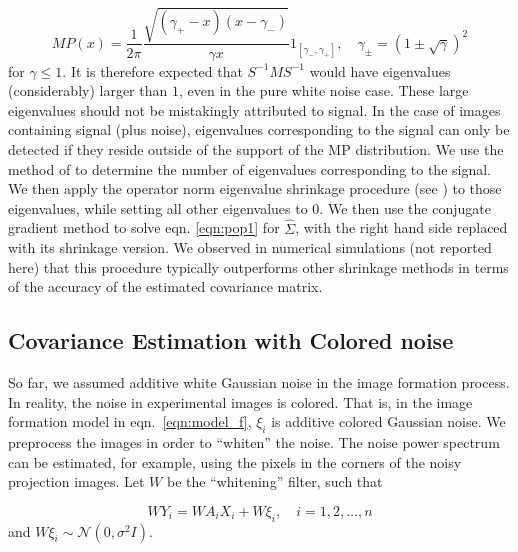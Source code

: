 \documentclass[review]{elsarticle}
\begin{document}
\begin{equation}
MP(x) = \frac{1}{2\pi}\frac{\sqrt{(\gamma_+ - x)(x - \gamma_-)}}{\gamma x}1_{[\gamma_-,\gamma_+]}, \quad \gamma_{\pm} =(1 \pm \sqrt{\gamma})^2 
\end{equation}
for $\gamma \leq 1$. It is therefore expected that $S^{-1}MS^{-1}$ would have eigenvalues 
(considerably) larger than $1$, even in the pure white noise case. These large 
eigenvalues should not be mistakingly attributed to signal. In the case of 
images containing signal (plus noise), eigenvalues corresponding to the signal 
can only be detected if they reside outside of the support of the MP 
distribution. We use the method of \cite{knadler} to determine the number of eigenvalues 
corresponding to the signal. We then apply the operator norm eigenvalue 
shrinkage procedure (see \cite{donoho}) to those eigenvalues, while setting all other eigenvalues to 
$0$. We then use the conjugate gradient method to solve eqn. \ref{eqn:pop1} for $\hat{\Sigma}$, with the right hand side 
replaced with its shrinkage version. We observed in numerical simulations (not reported here) that this procedure
typically outperforms other shrinkage methods in terms of the accuracy of the estimated covariance matrix.
 

\subsection{Covariance Estimation with Colored noise}
\label{sec:covest_col}
So far, we assumed additive white Gaussian noise in the image formation 
process. In reality, the noise in experimental images
is colored. That is, in the image formation model in eqn.\ \ref{eqn:model_f},
$\xi_i$ is additive colored Gaussian noise. 
We preprocess the images in order to ``whiten'' the noise.
The noise power spectrum can be estimated, for example, using the pixels in the corners of the noisy projection images.
Let $W$ be the ``whitening'' filter, such that

\begin{equation}
 WY_i=WA_{i}X_i + W\xi_i, \quad i=1,2,\ldots,n
 \label{eqn:col_model}
\end{equation}
and $W \xi_i \sim \mathcal{N}(0,\sigma^2 I)$. 
\end{document}

